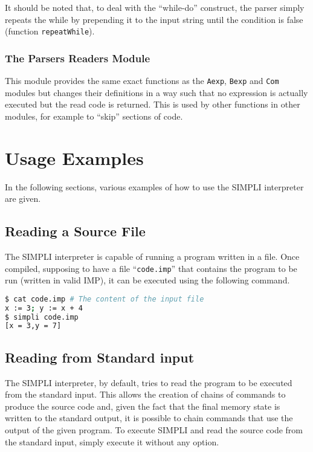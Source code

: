 \documentclass{esposito-documentation}
\begin{document}


It should be noted that, to deal with the ``while-do'' construct, the parser
simply repeats the while by prepending it to the input string until the
condition is false (function \lstinline|repeatWhile|).

\subsection{The Parsers Readers Module}


This module provides the same exact functions as the \texttt{Aexp},
\texttt{Bexp} and \texttt{Com} modules but changes their definitions in a way
such that no expression is actually executed but the read code is returned.
This is used by other functions in other modules, for example to ``skip''
sections of code.


\chapter{Usage Examples}

In the following sections, various examples of how to use the SIMPLI
interpreter are given.

\section{Reading a Source File}

The SIMPLI interpreter is capable of running a program written in a file. Once
compiled, supposing to have a file ``\texttt{code.imp}'' that contains the
program to be run (written in valid IMP), it can be executed using the
following command.

\begin{lstlisting}[language=sh,numbers=none]
$ cat code.imp # The content of the input file
x := 3; y := x + 4
$ simpli code.imp
[x = 3,y = 7]
\end{lstlisting}

\section{Reading from Standard input}

The SIMPLI interpreter, by default, tries to read the program to be executed
from the standard input. This allows the creation of chains of commands to
produce the source code and, given the fact that the final memory state is
written to the standard output, it is possible to chain commands that use the
output of the given program. To execute SIMPLI and read the source code from
the standard input, simply execute it without any option.
\end{document}
